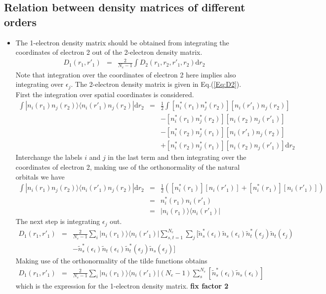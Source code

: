 \documentclass[aip,graphicx]{revtex4-1}
\begin{document}
\subsection{Relation between density matrices of different orders}

\begin{itemize}
    \item The 1-electron density matrix should be obtained from integrating the coordinates of electron 2 out of the 2-electron density matrix.
    \begin{eqnarray}
        D_1(r_1,r'_1) &=& \frac{2}{N_e-1}\int D_2(r_1,r_2,r'_1,r_2)\mathrm{d}r_2
    \end{eqnarray}
    Note that integration over the coordinates of electron 2 here implies also integrating over $\epsilon_j$. The 2-electron density matrix is given in Eq.(\ref{Eq:D2}). First the integration over spatial coordinates is considered.
    \begin{eqnarray}
        \int|n_i(r_1)n_j(r_2)\rangle\langle n_i(r'_1)n_j(r_2)|\mathrm{d}r_2 &=& 
        \frac{1}{2}\int [n_i^*(r_1)n_j^*(r_2)][n_i(r'_1)n_j(r_2)] \nonumber\\
        && - [n_i^*(r_1)n_j^*(r_2)][n_i(r_2)n_j(r'_1)] \nonumber\\
        && - [n_i^*(r_2)n_j^*(r_1)][n_i(r'_1)n_j(r_2)] \nonumber\\
        && + [n_i^*(r_2)n_j^*(r_1)][n_i(r_2)n_j(r'_1)] \mathrm{d} r_2
    \end{eqnarray}
    Interchange the labels $i$ and $j$ in the last term and then integrating over the coordinates of electron 2, making use of the orthonormality of the natural orbitals we have
    \begin{eqnarray}
        \int|n_i(r_1)n_j(r_2)\rangle\langle n_i(r'_1)n_j(r_2)|\mathrm{d}r_2 &=& 
        \frac{1}{2}\left( [n_i^*(r_1)][n_i(r'_1)] + [n_i^*(r_1)][n_i(r'_1)] \right) \nonumber \\
        &=& n_i^*(r_1)n_i(r'_1) \nonumber \\
        &=& |n_i(r_1)\rangle\langle n_i(r'_1)|
    \end{eqnarray}
    The next step is integrating $\epsilon_j$ out. 
    \begin{eqnarray}
        D_1(r_1,r'_1) &=& \frac{2}{N_e-1}\sum_i |n_i(r_1)\rangle\langle n_i(r'_1)|\sum_{s,t=1}^{N_e}\sum_j[\tilde{n}^*_s(\epsilon_i)\tilde{n}_s(\epsilon_i)\tilde{n}^*_t(\epsilon_j)\tilde{n}_t(\epsilon_j) \nonumber\\
        &&- \tilde{n}^*_s(\epsilon_i)\tilde{n}_t(\epsilon_i)\tilde{n}^*_t(\epsilon_j)\tilde{n}_s(\epsilon_j)]
    \end{eqnarray}
    Making use of the orthonormality of the tilde functions obtains
    \begin{eqnarray}
        D_1(r_1,r'_1) &=& \frac{2}{N_e-1}\sum_i |n_i(r_1)\rangle\langle n_i(r'_1)|(N_e-1)\sum_{s}^{N_e}[\tilde{n}^*_s(\epsilon_i)\tilde{n}_s(\epsilon_i)]
    \end{eqnarray}
    which is the expression for the 1-electron density matrix.
    {\bf fix factor 2}
\end{itemize}
\end{document}
